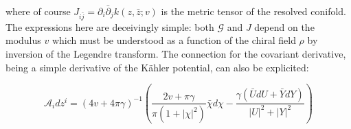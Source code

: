 where of course $J_{i\bar j} = \partial_i \bar \partial_j k(z,\bar z; v)$ is the metric tensor of the resolved conifold. The expressions here are deceivingly simple: both $\mathcal{G}$ and $J$ depend on the modulus $v$ which must be understood as a function of the chiral field $\rho$ by inversion of the Legendre transform. The connection for the covariant derivative, being a simple derivative of the K\"ahler potential, can also be explicited:

\begin{equation}
	\mathcal{A}_i dz^i = (4v + 4\pi \gamma)^{-1} \left( \frac{2v + \pi\gamma}{\pi(1+|\chi|^2)}\bar\chi d\chi - \frac{\gamma\left( \bar U dU + \bar Y dY \right)}{|U|^2 + |Y|^2} \right)
	\label{}
\end{equation}
